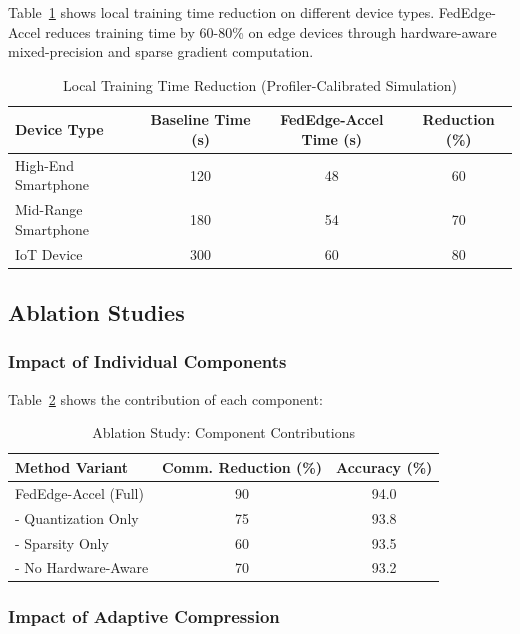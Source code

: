 \documentclass[journal]{IEEEtran}
\begin{document}
Table~\ref{tab:training_efficiency} shows local training time reduction on different device types. FedEdge-Accel reduces training time by 60-80\% on edge devices through hardware-aware mixed-precision and sparse gradient computation.

\begin{table}[!t]
\centering
\caption{Local Training Time Reduction (Profiler-Calibrated Simulation)}
\label{tab:training_efficiency}
\begin{tabularx}{\columnwidth}{lccc}
\toprule
Device Type & Baseline Time (s) & FedEdge-Accel Time (s) & Reduction (\%) \\
\midrule
High-End Smartphone & 120 & 48 & 60 \\
Mid-Range Smartphone & 180 & 54 & 70 \\
IoT Device & 300 & 60 & 80 \\
\bottomrule
\end{tabularx}
\end{table}

\subsection{Ablation Studies}

\subsubsection{Impact of Individual Components}

Table~\ref{tab:ablation} shows the contribution of each component:

\begin{table}[!t]
\centering
\caption{Ablation Study: Component Contributions}
\label{tab:ablation}
\begin{tabularx}{\columnwidth}{lcc}
\toprule
Method Variant & Comm. Reduction (\%) & Accuracy (\%) \\
\midrule
FedEdge-Accel (Full) & 90 & 94.0 \\
- Quantization Only & 75 & 93.8 \\
- Sparsity Only & 60 & 93.5 \\
- No Hardware-Aware & 70 & 93.2 \\
\bottomrule
\end{tabularx}
\end{table}

\subsubsection{Impact of Adaptive Compression}
\end{document}
